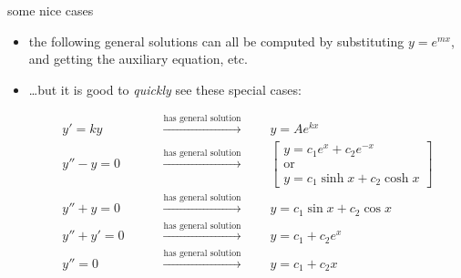 \documentclass{beamer}
\begin{document}
\begin{frame}{some nice cases}

\begin{itemize}
\item the following general solutions can all be computed by substituting $y=e^{mx}$, and getting the auxiliary equation, etc.
\item \dots but it is good to \emph{quickly} see these special cases:
\newcommand{\genarrow}{\qquad \stackrel{\text{has general solution}}{\longrightarrow} \qquad}

\begin{align*}
y' = k y &\genarrow y=Ae^{kx} \\
y'' - y = 0 &\genarrow \left[\begin{matrix} y=c_1e^x+c_2e^{-x} \\
                                      \text{or} \\
                                      y=c_1\sinh x + c_2\cosh x\end{matrix}\right] \\
y'' + y = 0 &\genarrow y=c_1\sin x + c_2\cos x \\
y'' + y' = 0 &\genarrow y=c_1 + c_2e^x \\
y'' = 0 &\genarrow y=c_1 + c_2 x
\end{align*}
\end{itemize}
\end{frame}
\end{document}
